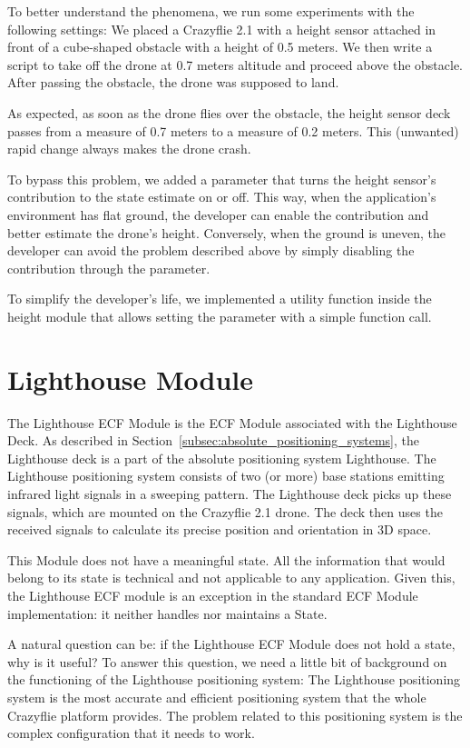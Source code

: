 To better understand the phenomena, we run some experiments with the following settings:
We placed a Crazyflie 2.1 with a height sensor attached in front of a cube-shaped obstacle with a height of 0.5 meters. 
We then write a script to take off the drone at 0.7 meters altitude and proceed above the obstacle. 
After passing the obstacle, the drone was supposed to land. 

As expected, as soon as the drone flies over the obstacle, the height sensor deck passes from a measure of 0.7 meters to a measure of 0.2 meters. 
This (unwanted) rapid change always makes the drone crash. 

To bypass this problem, we added a parameter that turns the height sensor's contribution to the state estimate on or off.
This way, when the application's environment has flat ground, the developer can enable the contribution and better estimate the drone's height.
Conversely, when the ground is uneven, the developer can avoid the problem described above by simply disabling the contribution through the parameter. 

To simplify the developer's life, we implemented a utility function inside the height module that allows setting the parameter with a simple function call. 

\section{Lighthouse Module}\label{sec:module_lighthouse}

The Lighthouse ECF Module is the ECF Module associated with the Lighthouse Deck. As described in Section~\ref{subsec:absolute_positioning_systems}, the Lighthouse deck is a part of the absolute positioning system Lighthouse.
The Lighthouse positioning system consists of two (or more) base stations emitting infrared light signals in a sweeping pattern. 
The Lighthouse deck picks up these signals, which are mounted on the Crazyflie 2.1 drone. 
The deck then uses the received signals to calculate its precise position and orientation in 3D space.

This Module does not have a meaningful state. All the information that would belong to its state is technical and not applicable to any application.
Given this, the Lighthouse ECF module is an exception in the standard ECF Module implementation: it neither handles nor maintains a State.

A natural question can be: if the Lighthouse ECF Module does not hold a state, why is it useful?
To answer this question, we need a little bit of background on the functioning of the Lighthouse positioning system:
The Lighthouse positioning system is the most accurate and efficient positioning system that the whole Crazyflie platform provides. 
The problem related to this positioning system is the complex configuration that it needs to work.

